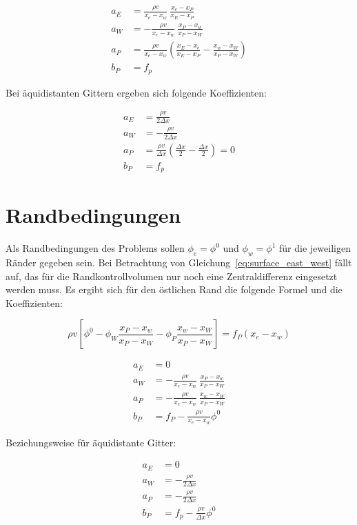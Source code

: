 \documentclass[10pt, ngerman,colorback,accentcolor=tud2d]{tudreport}
\begin{document}
\begin{align*}
  a_E &= \frac{\rho v}{x_e-x_w}\ \frac{x_e-x_P}{x_E-x_P}\\
  a_W &=-\frac{\rho v}{x_e-x_w}\ \frac{x_P-x_w}{x_P-x_W}\\
  a_P &= \frac{\rho v}{x_e-x_w} \left({\frac{x_E-x_e}{x_E-x_P}
-\frac{x_w-x_W}{x_P-x_W}}\right)\\
  b_P &= f_p
\end{align*}

Bei äquidistanten Gittern ergeben sich folgende Koeffizienten:

\begin{align*}
  a_E &= \frac{\rho v}{2\Delta x}\\
  a_W &=-\frac{\rho v}{2\Delta x}\\
  a_P &= \frac{\rho v}{\Delta x} \left({\frac{\Delta x}{2}
-\frac{\Delta x}{2}}\right) = 0\\
  b_P &= f_p
\end{align*}

\section{Randbedingungen}

Als Randbedingungen des Problems sollen $\phi_e = \phi^0$ und $\phi_w = \phi^1$ für die jeweiligen
Ränder gegeben sein. Bei Betrachtung von Gleichung~\eqref{eq:surface_east_west}
fällt auf, das für die Randkontrollvolumen nur noch eine Zentraldifferenz eingesetzt
werden muss. Es ergibt sich für den östlichen Rand die folgende Formel und die
Koeffizienten:

\begin{equation*}
  \rho v \left[{
  \phi^0  -\phi_W \frac{x_P-x_w}{x_P-x_W} - \phi_P \frac{x_w-x_W}{x_P-x_W}
  }\right]
  = f_P(x_e-x_w)
\end{equation*}

\begin{align*}
  a_E &= 0\\
  a_W &= -\frac{\rho v}{x_e-x_w}\ \frac{x_P-x_w}{x_P-x_W}\\
  a_P &= -\frac{\rho v}{x_e-x_w}\ \frac{x_w-x_W}{x_P-x_W}\\
  b_P &= f_P - \frac{\rho v}{x_e-x_w} \phi^0
\end{align*}

Beziehungsweise für äquidistante Gitter:

\begin{align*}
  a_E &= 0\\
  a_W &=-\frac{\rho v}{2\Delta x}\\
  a_P &=-\frac{\rho v}{2 \Delta x}\\
  b_P &= f_p- \frac{\rho v}{\Delta x}\phi^0
\end{align*}
\end{document}

